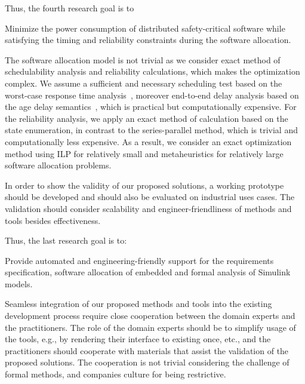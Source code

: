 Thus, the fourth research goal is to
\begin{researchgoal}
 Minimize the power consumption of distributed safety-critical software while satisfying the timing and reliability constraints during the software allocation.
\end{researchgoal}

The software allocation model is not trivial as we consider exact method of schedulability analysis and reliability calculations, which makes the optimization complex. We assume a sufficient and necessary scheduling test based on the worst-case response time analysis~\cite{Baruah2011Response-timeSystems}\cite{Davis2007ControllerRevised}, moreover end-to-end delay analysis based on the age delay semantics~\cite{mubeen2013support}, which is practical but computationally expensive. For the reliability analysis, we apply an exact method of calculation based on the state enumeration, in contrast to the series-parallel method, which is trivial and computationally less expensive. As a result, we consider an exact optimization method using ILP for relatively small and metaheuristics for relatively large software allocation problems.

In order to show the validity of our proposed solutions, a working prototype should be developed and should also be evaluated on industrial uses cases. The validation should consider scalability and engineer-friendliness of methods and tools besides effectiveness. 

Thus, the last research goal is to:
\begin{researchgoal}
 Provide automated and engineering-friendly support for the requirements specification, software allocation of embedded  and formal analysis of Simulink models.
\end{researchgoal}

Seamless integration of our proposed methods and tools into the existing development process require close cooperation between the domain experts and the practitioners. The role of the domain experts should be to simplify usage of the tools, e.g., by rendering their interface to existing once, etc., and the practitioners should cooperate with materials that assist the validation of the proposed solutions. The cooperation is not trivial considering the challenge of formal methods, and companies culture for being restrictive.
